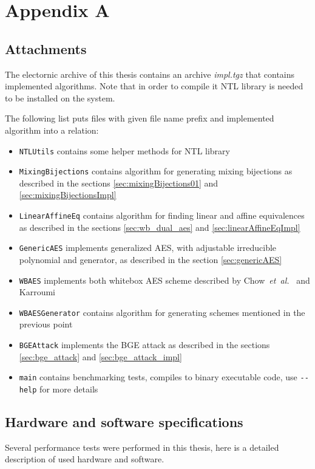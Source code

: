 \documentclass[11pt,oneside,final]{fithesis2}
\newcommand{\eal}{\emph{et~al.}}
\begin{document}
\appendix

\chapter{Appendix A}
    \section{Attachments}\label{appendix:attach}
    The electornic archive of this thesis contains an archive \emph{impl.tgz} that contains implemented algorithms. Note that in order to compile it
    NTL library is needed to be installed on the system.
    
    The following list puts files with given file name prefix and implemented algorithm into a relation:
    \begin{itemize}
     \item \verb+NTLUtils+ contains some helper methods for NTL library
     \item \verb+MixingBijections+ contains algorithm for generating mixing bijections as described in the sections \ref{sec:mixingBijections01} and \ref{sec:mixingBijectionsImpl}
     \item \verb+LinearAffineEq+ contains algorithm for finding linear and affine equivalences as described in the sections \ref{sec:wb_dual_aes} and \ref{sec:linearAffineEqImpl}
     \item \verb+GenericAES+ implements generalized AES, with adjustable irreducible polynomial and generator, as described in the section \ref{sec:genericAES}
     \item \verb+WBAES+ implements both whitebox AES scheme described by Chow~\eal~\citep{Chow02white-boxcryptography} and Karroumi~\citep{Karroumi:2010:PWA:2041036.2041060}
     \item \verb+WBAESGenerator+ contains algorithm for generating schemes mentioned in the previous point
     \item \verb+BGEAttack+ implements the BGE attack as described in the sections \ref{sec:bge_attack} and \ref{sec:bge_attack_impl}
     \item \verb+main+ contains benchmarking tests, compiles to binary executable code, use \verb+--help+ for more details
    \end{itemize}
    
    \section{Hardware and software specifications}\label{appendix:hw_spec}
    Several performance tests were performed in this thesis, here is a detailed description of used hardware and software.
    
\end{document}
